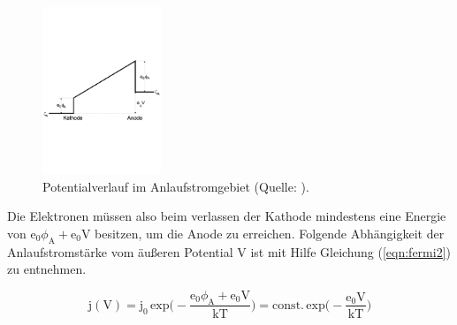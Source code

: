 \begin{figure}
    \centering
       \includegraphics[height=5cm]{anlauf.pdf}
       \caption{Potentialverlauf im Anlaufstromgebiet (Quelle: \cite{V504}).}
       \label{fig:anlauf}
\end{figure}

\noindent
Die Elektronen müssen also beim verlassen der Kathode mindestens eine Energie von $\text{e}_0 \phi_\text{A} + \text{e}_0 \text{V}$ besitzen,
um die Anode zu erreichen.
Folgende Abhängigkeit der Anlaufstromstärke vom äußeren Potential V ist mit Hilfe Gleichung (\ref{eqn:fermi2}) zu entnehmen.

\begin{equation}
\text{j}(\text{V}) = \text{j}_0 \, \text{exp} \biggl(-\frac{\text{e}_0 \phi_\text{A} + \text{e}_0 \text{V} }{\text{kT}} \biggr) = \text{const.} \, \text{exp} \biggl(-\frac{\text{e}_0 \text{V} }{\text{kT}} \biggr)
\label{eqn:anlauf}
\end{equation}


